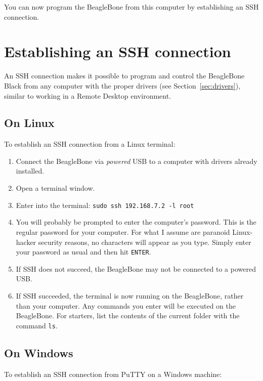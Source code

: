 \documentclass[11pt, letterpaper]{article}
\begin{document}
You can now program the BeagleBone from this computer by establishing an SSH connection.


\section{Establishing an SSH connection}
\label{sec:ssh}
An SSH connection makes it possible to program and control the BeagleBone Black from any computer with the proper drivers (see Section~\ref{sec:drivers}), similar to working in a Remote Desktop environment. 

\subsection{On Linux}
To establish an SSH connection from a Linux terminal:
 
 \begin{enumerate}
 	\item Connect the BeagleBone via \emph{powered} USB to a computer with drivers already installed. 
 	\item Open a terminal window.
 	\item Enter into the terminal: \texttt{sudo ssh 192.168.7.2 -l root}
 	\item You will probably be prompted to enter the computer's password. This is the regular password for your computer. For what I assume are paranoid Linux-hacker security reasons, no characters will appear as you type. Simply enter your password as usual and then hit \texttt{ENTER}.
 	\item If SSH does not succeed, the BeagleBone may not be connected to a powered USB.
 	\item If SSH succeeded, the terminal is now running on the BeagleBone, rather than your computer. Any commands you enter will be executed on the BeagleBone. For starters, list the contents of the current folder with the command \texttt{ls}.
 \end{enumerate}
 
\subsection{On Windows}
To establish an SSH connection from PuTTY on a Windows machine:
\end{document}
